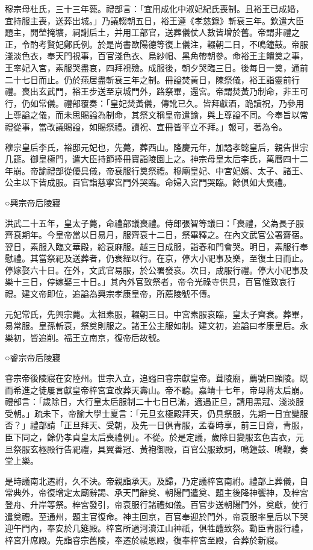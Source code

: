 穆宗母杜氏，三十三年薨。禮部言：「宜用成化中淑妃紀氏喪制。且裕王已成婚，宜持服主喪，送葬出城。」乃議輟朝五日，裕王遵《孝慈錄》斬衰三年。欽遣大臣題主，開塋掩壙，祠謝后土，并用工部官，送葬儀仗人數皆增於舊。帝謂非禮之正，令酌考賢妃鄭氏例。於是尚書歐陽德等復上儀注，輟朝二日，不鳴鐘鼓。帝服淺淡色衣，奉天門視事，百官淺色衣、烏紗帽、黑角帶朝參。命裕王主饋奠之事，王率妃入宮，素服哭盡哀，四拜視殮。成服後，朝夕哭臨三日。後每日一奠，通前二十七日而止。仍於燕居盡斬衰三年之制。冊謚焚黃日，陳祭儀，裕王詣靈前行禮。喪出玄武門，裕王步送至京城門外，路祭畢，還宮。帝謂焚黃乃制命，非王可行，仍如常儀。禮部覆奏：「皇妃焚黃儀，傳訛已久。皆拜獻酒，跪讀祝，乃參用上尊謚之儀，而未思賜謚為制命，其祭文稱皇帝遣諭，與上尊謚不同。今奉旨以常禮從事，當改議賜謚，如賜祭禮。讀祝、宣冊皆平立不拜。」報可，著為令。

穆宗皇后李氏，裕邸元妃也，先薨，葬西山。隆慶元年，加謚孝懿皇后，親告世宗几筵。御皇極門，遣大臣持節捧冊寶詣陵園上之。神宗母皇太后李氏，萬曆四十二年崩。帝諭禮部從優具儀，帝衰服行奠祭禮。穆廟皇妃、中宮妃嬪、太子、諸王、公主以下皆成服。百官詣慈寧宮門外哭臨。命婦入宮門哭臨。餘俱如大喪禮。

○興宗帝后陵寢

洪武二十五年，皇太子薨，命禮部議喪禮。侍郎張智等議曰：「喪禮，父為長子服齊衰期年。今皇帝當以日易月，服齊衰十二日，祭畢釋之。在內文武官公署齋宿。翌日，素服入臨文華殿，給衰麻服。越三日成服，詣春和門會哭。明日，素服行奉慰禮。其當祭祀及送葬者，仍衰絰以行。在京，停大小祀事及樂，至復土日而止。停嫁娶六十日。在外，文武官易服，於公署發哀。次日，成服行禮。停大小祀事及樂十三日，停嫁娶三十日。」其內外官致祭者，帝令光祿寺供具，百官惟致哀行禮。建文帝即位，追謚為興宗孝康皇帝，所薦陵號不傳。

元妃常氏，先興宗薨。太祖素服，輟朝三日。中宮素服哀臨，皇太子齊衰。葬畢，易常服。皇孫斬衰，祭奠則服之。諸王公主服如制。建文初，追謚曰孝康皇后。永樂初，皆追削。福王立南京，復帝后故號。

○睿宗帝后陵寢

睿宗帝後陵寢在安陸州。世宗入立，追謚曰睿宗獻皇帝。葺陵廟，薦號曰顯陵。既而希進之徒屢言獻皇帝梓宮宜改葬天壽山。帝不聽。嘉靖十七年，帝母蔣太后崩。禮部言：「歲除日，大行皇太后服制二十七日已滿，適遇正旦，請用黑冠、淺淡服受朝。」疏未下，帝諭大學士夏言：「元旦玄極殿拜天，仍具祭服，先期一日宜變服否？」禮部請「正旦拜天、受朝，及先一日俱青服，孟春時享，前三日齋，青服，臣下同之，餘仍孝貞皇太后喪禮例」。不從。於是定議，歲除日變服玄色吉衣，元旦祭服玄極殿行告祀禮，具翼善冠、黃袍御殿，百官公服致詞，鳴鐘鼓、鳴鞭，奏堂上樂。

是時議南北遷祔，久不決。帝親詣承天。及歸，乃定議梓宮南祔。禮部上葬儀，自常典外，帝復增定太廟辭謁、承天門辭奠、朝陽門遣奠、題主後降神饗神，及梓宮登舟、升岸等祭。梓宮發引，帝衰服行諸禮如儀。百官步送朝陽門外，奠獻，使行遣奠禮。至通州，題主官復命。神主回京，百官奉迎於門外，帝衰服率皇后以下哭迎午門內，奉安於几筵殿。梓宮所過河瀆江山神祇，俱牲醴致祭。勳臣青服行禮，梓宮升席殿。先詣睿宗舊陵，奉遷於祾恩殿，復奉梓宮至殿，合葬於新寢。

